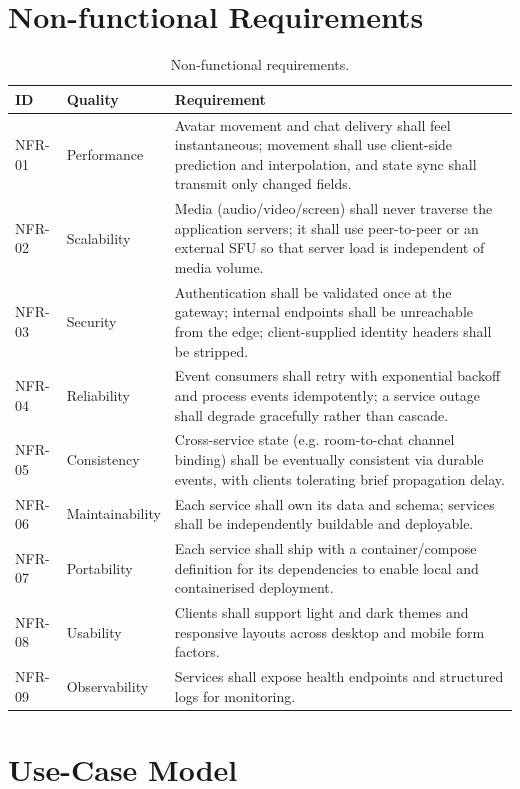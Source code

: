 \section{Non-functional Requirements}
\label{sec:nfr}

\begin{table}[htbp]
\centering
\caption{Non-functional requirements.}
\label{tab:nfr}
\small
\begin{tabularx}{\textwidth}{L{2.2cm} L{3.0cm} X}
\toprule
\textbf{ID} & \textbf{Quality} & \textbf{Requirement} \\
\midrule
NFR-01 & Performance & Avatar movement and chat delivery shall feel instantaneous; movement shall use client-side prediction and interpolation, and state sync shall transmit only changed fields. \\
NFR-02 & Scalability & Media (audio/video/screen) shall never traverse the application servers; it shall use peer-to-peer or an external SFU so that server load is independent of media volume. \\
NFR-03 & Security & Authentication shall be validated once at the gateway; internal endpoints shall be unreachable from the edge; client-supplied identity headers shall be stripped. \\
NFR-04 & Reliability & Event consumers shall retry with exponential backoff and process events idempotently; a service outage shall degrade gracefully rather than cascade. \\
NFR-05 & Consistency & Cross-service state (e.g. room-to-chat channel binding) shall be eventually consistent via durable events, with clients tolerating brief propagation delay. \\
NFR-06 & Maintainability & Each service shall own its data and schema; services shall be independently buildable and deployable. \\
NFR-07 & Portability & Each service shall ship with a container/compose definition for its dependencies to enable local and containerised deployment. \\
NFR-08 & Usability & Clients shall support light and dark themes and responsive layouts across desktop and mobile form factors. \\
NFR-09 & Observability & Services shall expose health endpoints and structured logs for monitoring. \\
\bottomrule
\end{tabularx}
\end{table}

\section{Use-Case Model}
\label{sec:usecases}

